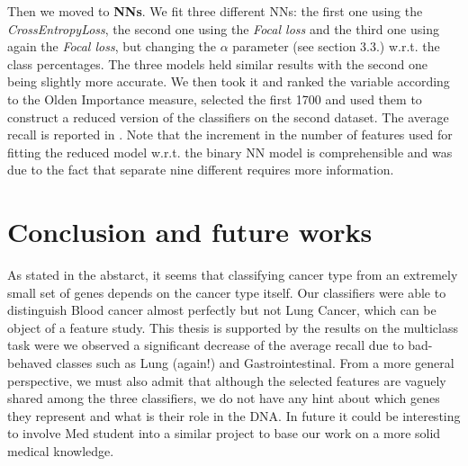 \documentclass[a4paper,11pt, oneside]{article}  %
\begin{document}
	Then we moved to \textbf{NNs}.  We fit three different NNs: the first one using the \textit{CrossEntropyLoss},  the second one using the \textit{Focal loss} and the third one using again the \textit{Focal loss},  but changing the $\alpha$ parameter (see section 3.3.) w.r.t.  the class percentages.  The three models held similar results with the second one being slightly more accurate.  We then took it and ranked the variable according to the Olden Importance measure,  selected the first 1700 and used them to construct a reduced version of the classifiers on the second dataset.  The average recall is reported in .  Note that the increment in the number of features used for fitting the reduced model w.r.t. the binary NN model is comprehensible and was due to the fact that separate nine different requires more information. 
	
	
	\section{Conclusion and future works}
As stated in the abstarct,  it seems that classifying cancer type from an extremely small set of genes depends on the cancer type itself.  Our classifiers were able to distinguish Blood cancer almost perfectly but not Lung Cancer,  which can be object of a feature study.  This thesis is supported by the results on the multiclass task were we observed a significant decrease of the average recall due to bad-behaved classes such as Lung (again!) and Gastrointestinal. 
From a more general perspective,  we must also admit that although the selected features are vaguely shared among the three classifiers,  we do not have any hint about which genes they represent and what is their role in the DNA.  In future it could be interesting to involve Med student into a similar project to base our work on a more solid medical knowledge. 
	
	
\end{document}
